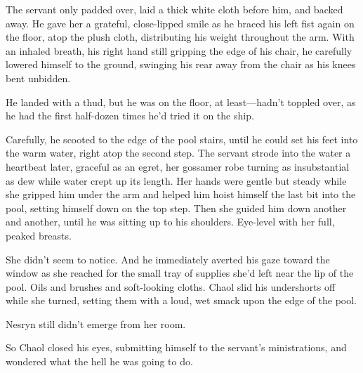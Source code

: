The servant only padded over, laid a thick white cloth before him, and backed away. He gave her a grateful, close-lipped smile as he braced his left fist again on the floor, atop the plush cloth, distributing his weight throughout the arm. With an inhaled breath, his right hand still gripping the edge of his chair, he carefully lowered himself to the ground, swinging his rear away from the chair as his knees bent unbidden.

He landed with a thud, but he was on the floor, at least---hadn't toppled over, as he had the first half-dozen times he'd tried it on the ship.

Carefully, he scooted to the edge of the pool stairs, until he could set his feet into the warm water, right atop the second step. The servant strode into the water a heartbeat later, graceful as an egret, her gossamer robe turning as insubstantial as dew while water crept up its length. Her hands were gentle but steady while she gripped him under the arm and helped him hoist himself the last bit into the pool, setting himself down on the top step. Then she guided him down another and another, until he was sitting up to his shoulders. Eye-level with her full, peaked breasts.

She didn't seem to notice. And he immediately averted his gaze toward the window as she reached for the small tray of supplies she'd left near the lip of the pool. Oils and brushes and soft-looking cloths. Chaol slid his undershorts off while she turned, setting them with a loud, wet smack upon the edge of the pool.

Nesryn still didn't emerge from her room.

So Chaol closed his eyes, submitting himself to the servant's ministrations, and wondered what the hell he was going to do.

